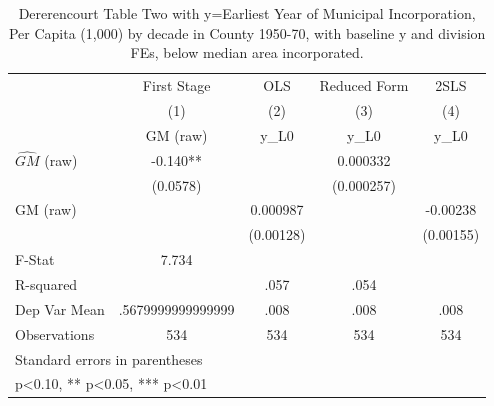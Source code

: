 \begin{table}[htbp]\centering
\def\sym#1{\ifmmode^{#1}\else\(^{#1}\)\fi}
\caption{Dererencourt Table Two with y=Earliest Year of Municipal Incorporation, Per Capita (1,000) by decade in County 1950-70, with baseline y and division FEs, below median area incorporated.}
\begin{tabular}{l*{4}{c}}
\toprule
                    & First Stage   &         OLS   &Reduced Form   &        2SLS   \\
                    &\multicolumn{1}{c}{(1)}&\multicolumn{1}{c}{(2)}&\multicolumn{1}{c}{(3)}&\multicolumn{1}{c}{(4)}\\
                    &\multicolumn{1}{c}{GM  (raw)}&\multicolumn{1}{c}{y\_L0}&\multicolumn{1}{c}{y\_L0}&\multicolumn{1}{c}{y\_L0}\\
\midrule
$\hat{GM}$ (raw)    &      -0.140** &               &    0.000332   &               \\
                    &    (0.0578)   &               &  (0.000257)   &               \\
\addlinespace
GM  (raw)           &               &    0.000987   &               &    -0.00238   \\
                    &               &   (0.00128)   &               &   (0.00155)   \\
\midrule
F-Stat              &       7.734   &               &               &               \\
R-squared           &               &        .057   &        .054   &               \\
Dep Var Mean        &.5679999999999999   &        .008   &        .008   &        .008   \\
Observations        &         534   &         534   &         534   &         534   \\
\bottomrule
\multicolumn{5}{l}{\footnotesize Standard errors in parentheses}\\
\multicolumn{5}{l}{\footnotesize * p<0.10, ** p<0.05, *** p<0.01}\\
\end{tabular}
\end{table}
